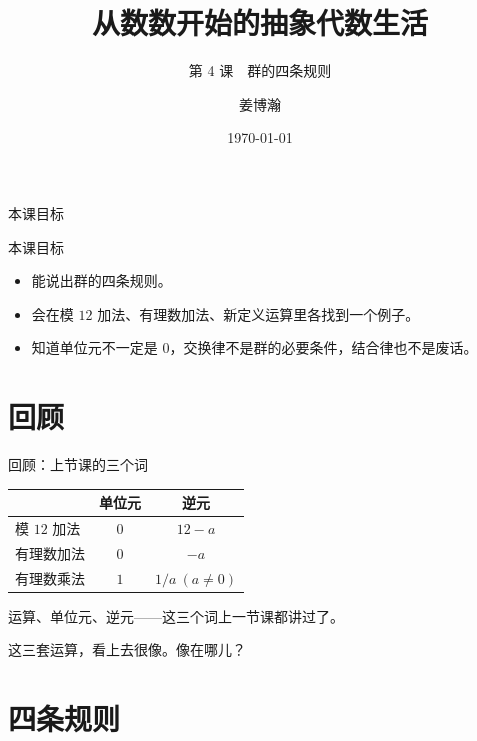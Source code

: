 \documentclass[10pt]{beamer}
\title{从数数开始的抽象代数生活}
\subtitle{第 4 课　群的四条规则}
\author{姜博瀚}
\institute{厦门大学附属实验中学}
\date{\today}
\begin{document}
\begin{frame}
  \titlepage
\end{frame}

\begin{frame}{本课目标}
  \begin{block}{本课目标}
    \begin{itemize}
      \item 能说出群的四条规则。
      \item 会在模 \(12\) 加法、有理数加法、新定义运算里各找到一个例子。
      \item 知道单位元不一定是 \(0\)，交换律不是群的必要条件，结合律也不是废话。
    \end{itemize}
  \end{block}
\end{frame}

\section{回顾}

\begin{frame}{回顾：上节课的三个词}
  \begin{center}
  \begin{tabular}{@{}lcc@{}}
    \toprule
     & \textbf{单位元} & \textbf{逆元} \\
    \midrule
    模 \(12\) 加法 & \(0\) & \(12-a\) \\
    有理数加法 & \(0\) & \(-a\) \\
    有理数乘法 & \(1\) & \(1/a\ (a\neq0)\) \\
    \bottomrule
  \end{tabular}
  \end{center}
  \pause
  \begin{center}
    运算、单位元、逆元——这三个词上一节课都讲过了。

    \pause

    {\large 这三套运算，看上去很像。\pause 像在哪儿？}
  \end{center}
\end{frame}

\section{四条规则}
\end{document}
